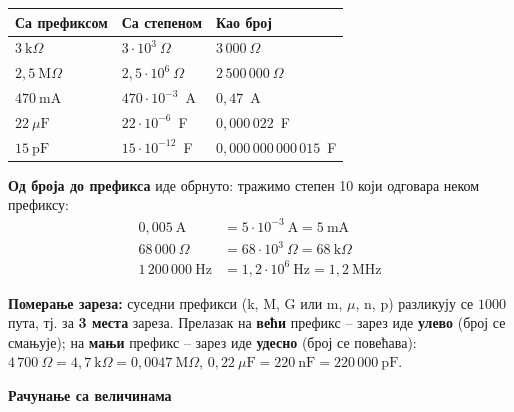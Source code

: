 \documentclass[10pt]{article}
\begin{document}
\vspace{4pt}
\begin{minipage}[t]{0.50\linewidth}
\vspace{0pt}
\centering\small
\renewcommand{\arraystretch}{1.1}
\begin{tabular}{|l|l|l|}
    \hline
    \textbf{Са префиксом} & \textbf{Са степеном} & \textbf{Као број} \\ \hline
    $3~\text{k}\Omega$      & $3\cdot 10^{3}~\Omega$       & $3\,000~\Omega$ \\ \hline
    $2{,}5~\text{M}\Omega$  & $2{,}5\cdot 10^{6}~\Omega$   & $2\,500\,000~\Omega$ \\ \hline
    $470~\text{mA}$         & $470\cdot 10^{-3}$~A         & $0{,}47$~A \\ \hline
    $22~\mu\text{F}$        & $22\cdot 10^{-6}$~F          & $0{,}000\,022$~F \\ \hline
    $15~\text{pF}$          & $15\cdot 10^{-12}$~F         & $0{,}000\,000\,000\,015$~F \\ \hline
\end{tabular}
\end{minipage}\hfill
\begin{minipage}[t]{0.47\linewidth}
\vspace{0pt}
\textbf{Од броја до префикса} иде обрнуто: тражимо степен 10 који
одговара неком префиксу:
\begin{align*}
0{,}005~\text{A} &= 5\cdot 10^{-3}~\text{A} = 5~\text{mA}\\
68\,000~\Omega &= 68\cdot 10^{3}~\Omega = 68~\text{k}\Omega\\
1\,200\,000~\text{Hz} &= 1{,}2\cdot 10^{6}~\text{Hz} = 1{,}2~\text{MHz}
\end{align*}
\end{minipage}

\begin{kljucno}
\textbf{Померање зареза:} суседни префикси (k, M, G или m, $\mu$, n, p)
разликују се $1000$ пута, тј. за \textbf{3 места} зареза.
Прелазак на \textbf{већи} префикс -- зарез иде \textbf{улево} (број се
смањује); на \textbf{мањи} префикс -- зарез иде \textbf{удесно} (број се
повећава):
$4\,700~\Omega = 4{,}7~\text{k}\Omega = 0{,}0047~\text{M}\Omega$, \quad
$0{,}22~\mu\text{F} = 220~\text{nF} = 220\,000~\text{pF}$.
\end{kljucno}

\textbf{Рачунање са величинама}
\vspace{-8pt}
\end{document}
